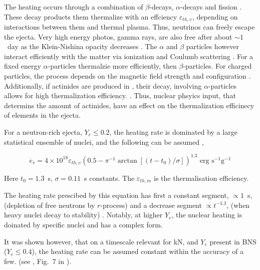 The heating occurs through a combination of $\beta$-decays, $\alpha$-decays and fission \citep{Metzger:2010,Barnes:2016umi,Hotokezaka:2017dbk}. These decay products them thermalize with an effciency $\varepsilon_{th,\upsilon}$, depending on interactions between them and thermal plasma.
Thus, neutrinos can freely escape the ejecta. Very high energy photos, gamma rays, are also free after about $\sim 1$~day as the Klein-Nishina opacity decreases \citep{Hotokezaka:2017dbk,Barnes:2016umi}.
The $\alpha$ and $\beta$ particles however interact efficiently with the matter via ionization \citep{Barnes:2016umi} and Coulumb scattering \cite{Metzger:2010}.
For a fixed energy $\alpha$-particles thermalzie more efficiently, then $\beta$-particles.
For charged particles, the process depends on the magnetic field strength and configuration \citep{Barnes:2016umi}.
Additionally, if actinides are produced in \rproc{}, their decay, involving $\alpha$-particles allows for high thermalization efficiency. . Thus, nuclear phsyics input, that determins the amount of actinides, have an effect on the thermalization efficinecy of \rproc{} elements in the ejecta.

For a neutron-rich ejecta, $Y_e\leq0.2$, the heating rate is dominated by a large statistical ensemble of nuclei, and the following can be assumed \citep{Korobkin:2012uy},

\begin{equation}
\dot{e}_r = 4\times 10^{18} \varepsilon_{th,\upsilon}(0.5 - \pi^{-1} \arctan[(t-t_0)/\sigma])^{1.3} \text{ erg } \text{s}^{-1} \text{g}^{-1}
\end{equation}

Here $t_0=1.3$~s, $\sigma=0.11$~s constants. The $\varepsilon_{th,m}$ is the thermalisation efficiency.

The heating rate prescibed by this equation has first a constant segment, $\propto1$~s, (depletion of free neutrons by $r$-process) and a decrease segment $\propto t^{-1.3}$, (when heavy nuclei decay to stability) \citep{Metzger:2010,Roberts:2011}. 
Notably, at higher $Y_e$, the nuclear heating is doinated by specific nuclei and has a complex form.

It was shown however, that on a timescale relevant for \ac{kN}, and $Y_e$ present in \ac{BNS} ($Y_e\leq0.4$), the heating rate can be assumed constant within the accuracy of a few.
(see \eg, Fig.~7 in \citet{Lippuner:2015gwa}).

